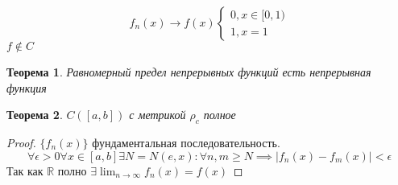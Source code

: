 \documentclass[14pt]{extarticle}
\newtheorem{theorem}{Теорема}
\begin{document}
 \begin{equation}
	 f_{n}(x) \to f(x) 
	 \begin{cases}
		 0 , x\in[0,1)\\
		 1 , x = 1
	 \end{cases}
 \end{equation} 
 $f \notin C$
  \begin{theorem}
 	Равномерный предел непрерывных функций
	есть непрерывная функция
 \end{theorem}
 \begin{theorem}
	 $C([a,b])$ с метрикой  $\rho_{c}$ полное
 \end{theorem}
 \begin{proof}
	 $\{f_{n}(x)\}$  фундаментальная последовательность.
	 \begin{equation}
		 \forall  \epsilon > 0 \forall  x\in [a,b] 
		 \exists  N = N(e,x) :
		 \forall n,m \ge  N \implies |f_{n}(x) -f_{m} (x) | <\epsilon
	 \end{equation} 
	 Так как $\mathbb{R}$ полно $\exists  \lim_{n \to \infty} 
	 f_{n}(x) = f(x)$
 \end{proof}
\end{document}

